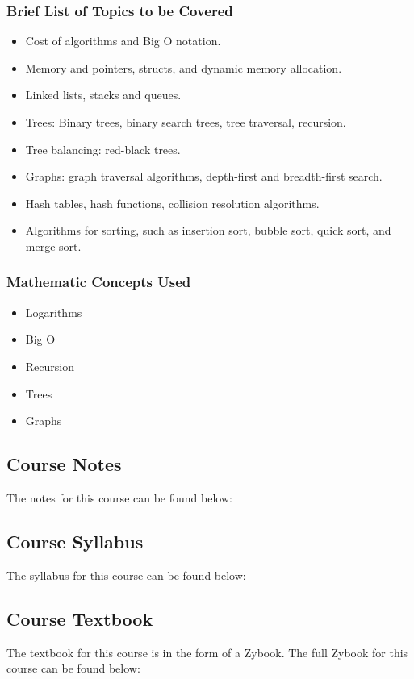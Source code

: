 {\begin{highlight}[\CSPBDataStruct]
        \subsubsection*{Brief List of Topics to be Covered}
    
        \begin{itemize}
            \item Cost of algorithms and Big O notation.
            \item Memory and pointers, structs, and dynamic memory allocation.
            \item Linked lists, stacks and queues.
            \item Trees: Binary trees, binary search trees, tree traversal, recursion.
            \item Tree balancing: red-black trees.
            \item Graphs: graph traversal algorithms, depth-first and breadth-first search.
            \item Hash tables, hash functions, collision resolution algorithms.
            \item Algorithms for sorting, such as insertion sort, bubble sort, quick sort, and merge sort.
        \end{itemize}
        
        \subsubsection*{Mathematic Concepts Used}
    
        \begin{itemize}
            \item Logarithms
            \item Big O
            \item Recursion
            \item Trees
            \item Graphs
        \end{itemize}
    \end{highlight}
}

\subsection{Course Notes}

The notes for this course can be found below: \coursedoc{\CSPBDataStructCourseNotes}

\subsection{Course Syllabus}

The syllabus for this course can be found below: \coursedoc{\CSPBDataStructSyllabus}

\subsection{Course Textbook}

The textbook for this course is in the form of a Zybook. The full Zybook for this course can be found below: \coursedoc{\CSPBDataStructTextbook}